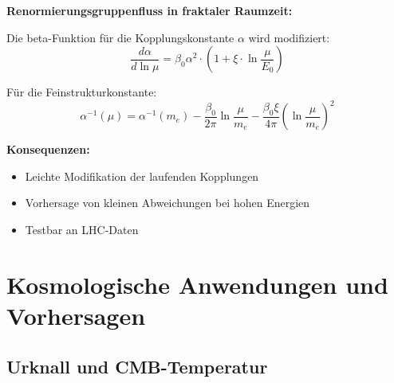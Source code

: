 \documentclass[12pt,a4paper]{article}
\newcommand{\xipar}{\xi}
\begin{document}
	\begin{beziehung}
		\textbf{Renormierungsgruppenfluss in fraktaler Raumzeit:}
		
		Die beta-Funktion für die Kopplungskonstante $\alpha$ wird modifiziert:
		\begin{equation}
			\frac{d\alpha}{d\ln\mu} = \beta_0 \alpha^2 \cdot \left(1 + \xipar \cdot \ln\frac{\mu}{E_0}\right)
		\end{equation}
		
		Für die Feinstrukturkonstante:
		\begin{equation}
			\alpha^{-1}(\mu) = \alpha^{-1}(m_e) - \frac{\beta_0}{2\pi} \ln\frac{\mu}{m_e} - \frac{\beta_0 \xipar}{4\pi} \left(\ln\frac{\mu}{m_e}\right)^2
		\end{equation}
		
		\textbf{Konsequenzen:}
		\begin{itemize}
			\item Leichte Modifikation der laufenden Kopplungen
			\item Vorhersage von kleinen Abweichungen bei hohen Energien
			\item Testbar an LHC-Daten
		\end{itemize}
	\end{beziehung}
	
	\section{Kosmologische Anwendungen und Vorhersagen}
	
	\subsection{Urknall und CMB-Temperatur}
	
\end{document}
